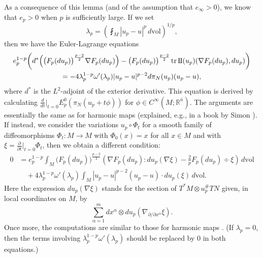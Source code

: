 \documentclass[10pt,a4paper]{amsart}
\newcommand{\R}{\mathbb{R}}
\newcommand{\vol}{\mathrm{vol}}
\newcommand{\ndim}{{\bar{n}}}
\newcommand{\sff}{\mathrm{I{\mkern -1mu}I}}
\DeclareMathOperator{\tr}{tr}
\newcommand{\dd}[2]{\frac{\partial #1}{\partial #2}}
\begin{document}
As a consequence of this lemma (and of the assumption that $e_\infty > 0$), we know that $e_p > 0$ when $p$ is sufficiently large. If we set
\[
\lambda_p = \left(\fint_M |u_p - u|^p \, d\vol\right)^{1/p},
\]
then we have the Euler-Lagrange equations
\begin{multline*}
e_p^{1 - p} \biggl(d^*\Bigl(\bigl(F_p(du_p)\bigr)^{\frac{p - 2}{2}} \nabla F_p(du_p)\Bigr) - \bigl(F_p(du_p)\bigr)^{\frac{p - 2}{2}} \tr \sff(u_p)(\nabla F_p(du_p), du_p)\biggr) \\
= -4\lambda_p^{1 - p} \omega'(\lambda_p) |u_p - u|^{p - 2} d\pi_N(u_p)(u_p - u),
\end{multline*}
where $d^*$ is the $L^2$-adjoint of the exterior derivative.
This equation is derived by calculating $\frac{d}{dt}|_{t = 0} E_p^0(\pi_N(u_p + t\phi))$ for $\phi \in C^\infty(M; \R^\ndim)$. The arguments are essentially
the same as for harmonic maps (explained, e.g., in a book by Simon \cite{Simon:96}).  If instead, we consider the variations
$u_p \circ \Phi_t$ for
a smooth family of diffeomorphisms $\Phi_t \colon M \to M$ with $\Phi_0(x) = x$
for all $x \in M$ and with $\xi = \dd{}{t}|_{t = 0} \Phi_t$, then we obtain a different condition:
\[
\begin{split}
0 & = e_p^{1 - p} \int_M \bigl(F_p(du_p)\bigr)^{\frac{p - 2}{2}} \left(\nabla F_p(du_p) : du_p(\nabla \xi) - \frac{2}{p} F_p(du_p) \div \xi\right) \, d\vol \\
& \quad + 4\lambda_p^{1 - p} \omega'(\lambda_p) \int_M |u_p - u|^{p - 2} (u_p - u) \cdot du_p(\xi) \, d\vol.
\end{split}
\]
Here the expression $du_p(\nabla \xi)$ stands for the section of
$T^*M \otimes u_p^\# TN$ given, in local coordinates on $M$, by
\[
\sum_{\alpha = 1}^m dx^\alpha \otimes du_p(\nabla_{\partial/\partial x^\alpha} \xi).
\]
Once more, the computations are similar to those for harmonic maps
\cite{Price:83, Grosse-Brauckmann:92}.
(If $\lambda_p = 0$, then the terms involving $\lambda_p^{1 - p} \omega'(\lambda_p)$ should be
replaced by $0$ in both equations.)
\end{document}
